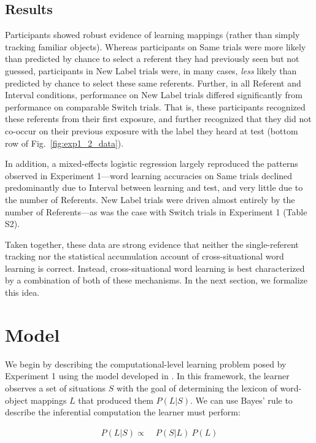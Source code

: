 \documentclass{pnastwo}
\begin{document}
\begin{article}
\subsection{Results}

Participants showed robust evidence of learning mappings (rather than simply tracking familiar objects). Whereas participants on Same trials were more likely than predicted by chance to select a referent they had previously seen but not guessed, participants in New Label trials were, in many cases, \emph{less} likely than predicted by chance to select these same referents. Further, in all Referent and Interval conditions, performance on New Label trials differed significantly from performance on comparable Switch trials. That is, these participants recognized these referents from their first exposure, and further recognized that they did not co-occur on their previous exposure with the label they heard at test (bottom row of Fig.~\ref{fig:exp1_2_data}).

In addition, a mixed-effects logistic regression largely reproduced the patterns observed in Experiment 1---word learning accuracies on Same trials declined predominantly due to Interval between learning and test, and very little due to the number of Referents. New Label trials were driven almost entirely by the number of Referents---as was the case with Switch trials in Experiment 1 (Table S2).

Taken together, these data are strong evidence that neither the single-referent tracking nor the statistical accumulation account of cross-situational word learning is correct. Instead, cross-situational word learning is best characterized by a combination of both of these mechanisms. In the next section, we formalize this idea.

\section{Model}

We begin by describing the computational-level learning problem posed by Experiment 1 using the model developed in \citep{Frank2009a}. In this framework, the learner observes a set of situations $S$ with the goal of determining the lexicon of word-object mappings $L$ that produced them $P(L|S)$. We can use Bayes' rule to describe the inferential computation the learner must perform: 

\begin{align} 
P(L|S) \propto & \;P(S|L) \: P(L) \label{eq:wurwur1}
\end{align}


\end{article}
\end{document}
